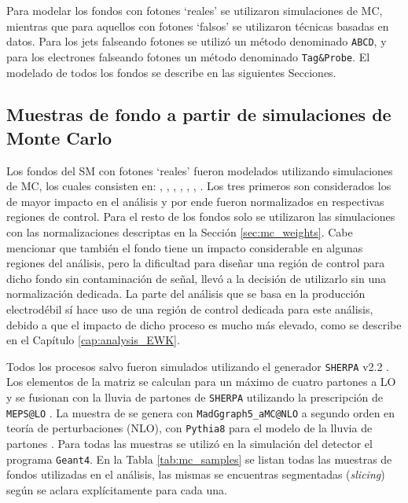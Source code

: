 Para modelar los fondos con fotones `reales' se utilizaron simulaciones de MC, mientras que para aquellos con fotones `falsos' se utilizaron técnicas basadas en datos. 
Para los jets falseando fotones se utilizó un método denominado \texttt{ABCD}, y para los electrones falseando fotones un método denominado \texttt{Tag\&Probe}. El modelado de todos los fondos se describe en las siguientes Secciones.

\subsection{Muestras de fondo a partir de simulaciones de Monte Carlo}

Los fondos del SM con fotones `reales' fueron modelados utilizando simulaciones de MC, los cuales consisten en: \phj, \wph, \ttbarph, \wphph, \zph, \zphph, \phph. Los tres primeros son considerados los de mayor impacto en el análisis y por ende fueron normalizados en respectivas regiones de control. Para el resto de los fondos solo se utilizaron las simulaciones con las normalizaciones descriptas en la Sección \ref{sec:mc_weights}. 
Cabe mencionar que también el fondo \znunuph tiene un impacto considerable en algunas regiones del análisis, pero la dificultad para diseñar una región de control para dicho fondo sin contaminación de señal, llevó a la decisión de utilizarlo sin una normalización dedicada. 
La parte del análisis que se basa en la producción electrodébil sí hace uso de una región de control dedicada para este análisis, debido a que el impacto de dicho proceso es mucho más elevado, como se describe en el Capítulo \ref{cap:analysis_EWK}.

Todos los procesos salvo \ttbarph fueron simulados utilizando el generador {\texttt{SHERPA} v2.2} \cite{Bothmann:2019yzt}. Los elementos de la matriz se calculan para un máximo de cuatro partones
a LO y se fusionan con la lluvia de partones de \texttt{SHERPA} \cite{Schumann:2007mg} utilizando la prescripción de \texttt{MEPS@LO} \cite{Hoeche:2012yf}. La muestra de \ttbarph se genera con \texttt{MadGgraph5\_aMC@NLO} \cite{Alwall:2014hca} a segundo orden en teoría de perturbaciones (NLO), con \texttt{Pythia8} para el modelo de la lluvia de partones \cite{Sjostrand:2014zea}. 
Para todas las muestras se utilizó en la simulación del detector el programa \texttt{Geant4}. En la Tabla \ref{tab:mc_samples} se listan todas las muestras de fondos utilizadas en el análisis, las mismas se encuentras segmentadas (\textit{slicing}) según se aclara explícitamente para cada una.

